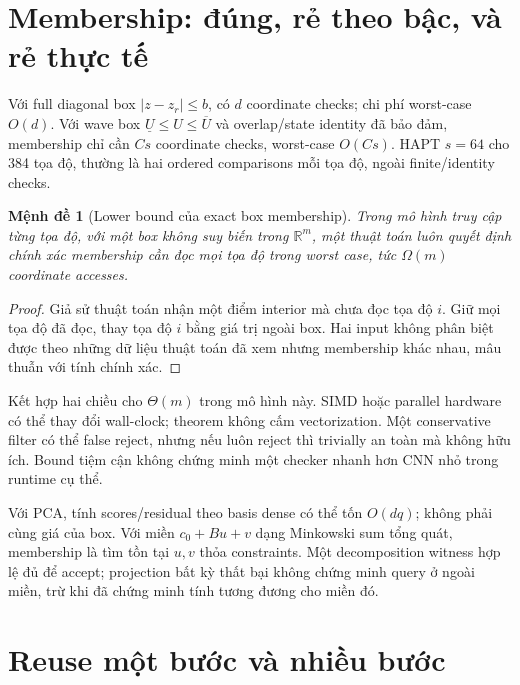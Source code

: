 \documentclass[11pt,a4paper]{article}
\newcommand{\R}{\mathbb R}
\newtheorem{proposition}[definition]{Mệnh đề}
\theoremstyle{remark}
\begin{document}
\section{Membership: đúng, rẻ theo bậc, và rẻ thực tế}
Với full diagonal box $|z-z_r|\le b$, có $d$ coordinate checks; chi phí
worst-case $O(d)$. Với wave box $\underline U\le U\le\overline U$ và
overlap/state identity đã bảo đảm, membership chỉ cần $Cs$ coordinate
checks, worst-case $O(Cs)$. HAPT $s=64$ cho 384 tọa độ, thường là hai
ordered comparisons mỗi tọa độ, ngoài finite/identity checks.

\begin{proposition}[Lower bound của exact box membership]
Trong mô hình truy cập từng tọa độ, với một box không suy biến trong
$\R^m$, một thuật toán luôn quyết định chính xác membership cần đọc mọi
tọa độ trong worst case, tức $\Omega(m)$ coordinate accesses.
\end{proposition}
\begin{proof}
Giả sử thuật toán nhận một điểm interior mà chưa đọc tọa độ $i$. Giữ mọi
tọa độ đã đọc, thay tọa độ $i$ bằng giá trị ngoài box. Hai input không phân
biệt được theo những dữ liệu thuật toán đã xem nhưng membership khác nhau,
mâu thuẫn với tính chính xác.
\end{proof}
Kết hợp hai chiều cho $\Theta(m)$ trong mô hình này. SIMD hoặc parallel
hardware có thể thay đổi wall-clock; theorem không cấm vectorization.
Một conservative filter có thể false reject, nhưng nếu luôn reject thì
trivially an toàn mà không hữu ích. Bound tiệm cận không chứng minh một
checker nhanh hơn CNN nhỏ trong runtime cụ thể.

Với PCA, tính scores/residual theo basis dense có thể tốn $O(dq)$; không
phải cùng giá của box. Với miền $c_0+Bu+v$ dạng Minkowski sum tổng quát,
membership là tìm tồn tại $u,v$ thỏa constraints. Một decomposition witness
hợp lệ đủ để accept; projection bất kỳ thất bại không chứng minh query ở
ngoài miền, trừ khi đã chứng minh tính tương đương cho miền đó.

\section{Reuse một bước và nhiều bước}
\end{document}
